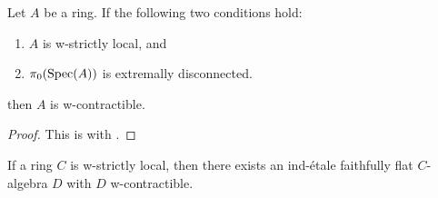 \begin{proposition} %
  \label{thm:w-contractible-if}
  Let $A$ be a ring. If the following two conditions hold:
  \begin{enumerate}
    \item $A$ is w-strictly local, and
    \item $\pi_0(\operatorname{Spec} (A))$ is extremally disconnected.
  \end{enumerate}
  then $A$ is w-contractible.
\end{proposition}

\begin{proof}
  This is  with .
\end{proof}
  

\begin{lemma}
  If a ring \(C\) is w-strictly local, then there exists an ind-étale faithfully flat \(C\)-algebra \(D\) with \(D\) w-contractible.
  \label{thm:ind-etale-w-contractible-cover-of-w-strictly-local}
\end{lemma}

